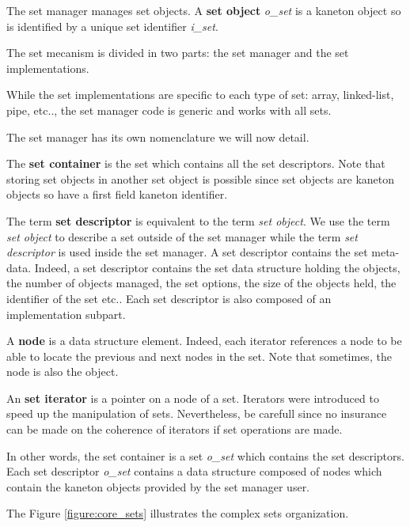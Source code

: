 The set manager manages set objects. A \textbf{set object} \textit{o\_set}
is a kaneton object so is identified by a unique set identifier
\textit{i\_set}.

The set mecanism is divided in two parts: the set manager and the set
implementations.

While the set implementations are specific to each type of set: array,
linked-list, pipe, etc.., the set manager code is generic and works with all
sets.

The set manager has its own nomenclature we will now detail.

The \textbf{set container} is the set which contains all the set descriptors.
Note that storing set objects in another set object is possible since
set objects are kaneton objects so have a first field kaneton identifier.

The term \textbf{set descriptor} is equivalent to the term \textit{set object}.
We use the term \textit{set object} to describe a set outside of the set
manager while the term \textit{set descriptor} is used inside the set
manager. A set descriptor contains the set meta-data. Indeed, a set descriptor
contains the set data structure holding the objects, the number of objects
managed, the set options, the size of the objects held, the identifier of
the set etc.. Each set descriptor is also composed of an implementation
subpart.

A \textbf{node} is a data structure element. Indeed, each iterator
references a node to be able to locate the previous and next nodes in
the set. Note that sometimes, the node is also the object.

An \textbf{set iterator} is a pointer on a node of a set. Iterators were
introduced to speed up the manipulation of sets. Nevertheless, be carefull
since no insurance can be made on the coherence of iterators if set
operations are made.

In other words, the set container is a set \textit{o\_set} which contains
the set descriptors. Each set descriptor \textit{o\_set} contains a data
structure composed of nodes which contain the kaneton objects provided by
the set manager user.

The Figure \ref{figure:core_sets} illustrates the complex sets organization.

